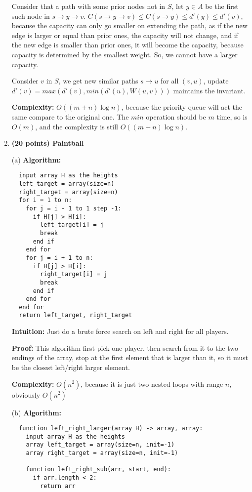 \documentclass{article}
\begin{document}
\begin{enumerate}[topsep=0pt]
Consider that a path with some prior nodes not in $S$, let $y\in A$ be the first such node in $s\rightarrow y\rightarrow v$.
$C(s\rightarrow y\rightarrow v)\leq C(s\rightarrow y)\leq d'(y)\leq d'(v)$, because the capacity can only go smaller on extending the path,
as if the new edge is larger or equal than prior ones, the capacity will not change, and if the new edge is smaller than prior ones, it will become the capacity,
because capacity is determined by the smallest weight. So, we cannot have a larger capacity.

Consider $v$ in $S$, we get new similar paths $s\rightarrow u$ for all $(v,u)$, update $d'(v)=max(d'(v),min(d'(u),W(u,v)))$ maintains the invariant.


\textbf{Complexity:}
$O((m+n)\log{n})$, because the priority queue will act the same compare to the original one.
The $min$ operation should be $m$ time, so is $O(m)$, and the complexity is still $O((m+n)\log{n})$.

\item \textbf{(20 points) Paintball} 

(a) \textbf{Algorithm:}
\begin{verbatim}
  input array H as the heights
  left_target = array(size=n)
  right_target = array(size=n)
  for i = 1 to n:
    for j = i - 1 to 1 step -1:
      if H[j] > H[i]:
        left_target[i] = j
        break
      end if
    end for
    for j = i + 1 to n:
      if H[j] > H[i]:
        right_target[i] = j
        break
      end if
    end for
  end for
  return left_target, right_target
\end{verbatim}

\textbf{Intuition:} Just do a brute force search on left and right for all players.

\textbf{Proof:} This algorithm first pick one player, then search from it to the two endings of the array,
stop at the first element that is larger than it, so it must be the closest left/right larger element.

\textbf{Complexity:} $O(n^2)$, because it is just two nested loops with range $n$, obviously $O(n^2)$

(b) \textbf{Algorithm:}
\begin{verbatim}
  function left_right_larger(array H) -> array, array:
    input array H as the heights
    array left_target = array(size=n, init=-1)
    array right_target = array(size=n, init=-1)

    function left_right_sub(arr, start, end):
      if arr.length < 2:
        return arr


\end{verbatim}
\end{enumerate}
\end{document}
